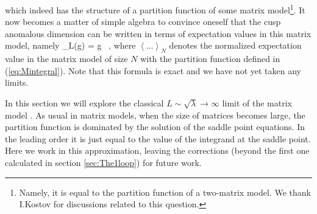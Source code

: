 which indeed has the structure of a partition function of some matrix model\footnote{Namely, it is equal to the partition function of a two-matrix model. We thank I.Kostov for discussions related to this question.}. It now becomes a matter of simple algebra to convince oneself that the cusp anomalous dimension  can be written in terms of expectation values in this matrix model, namely
\beq
	\Gamma_L(g) = g \,  \left[ \,\, \left< \sum_{i=1}^{2L+1} \( x_i - \frac{1}{x_i}\)  \right>_{2L+1} - \,\,\, \left<  \sum_{i=1}^{2L-1} \(x_i - \frac{1}{x_i}\) \right>_{2L-1} \right],
\eeq
where $\left< \dots \right>_{N}$ denotes the normalized expectation value in the matrix model of size $N$ with the partition function defined in (\ref{eq:Mintegral}). Note that this formula is exact and we have not yet taken any limits.


In this section we will explore the classical $L\sim\sqrt \lambda\rightarrow \infty$ limit of the matrix model .  As usual in matrix models, when the size of matrices becomes large, the partition function is dominated by the solution of the saddle point equations. In the leading order it is just equal to the value of the integrand at the saddle point. Here we work in this approximation, leaving the corrections (beyond the first one calculated in section \ref{sec:The1loop}) for future work.


